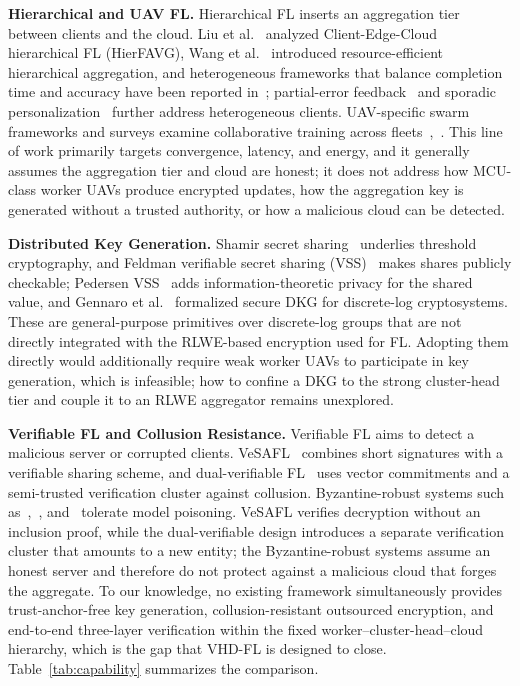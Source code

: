 \textbf{Hierarchical and UAV FL.} Hierarchical FL inserts an aggregation tier between clients and the cloud. Liu et al.~\cite{liu2020hierfavg} analyzed Client-Edge-Cloud hierarchical FL (HierFAVG), Wang et al.~\cite{wang2021rflha} introduced resource-efficient hierarchical aggregation, and heterogeneous frameworks that balance completion time and accuracy have been reported in~\cite{wang2026heterogeneous}; partial-error feedback~\cite{xin2026safe} and sporadic personalization~\cite{rahman2026tackling} further address heterogeneous clients. UAV-specific swarm frameworks and surveys examine collaborative training across fleets~\cite{nagarajan2025drone},~\cite{ahmed2025uav}. This line of work primarily targets convergence, latency, and energy, and it generally assumes the aggregation tier and cloud are honest; it does not address how MCU-class worker UAVs produce encrypted updates, how the aggregation key is generated without a trusted authority, or how a malicious cloud can be detected.

\textbf{Distributed Key Generation.} Shamir secret sharing~\cite{shamir1979} underlies threshold cryptography, and Feldman verifiable secret sharing (VSS)~\cite{feldman1987} makes shares publicly checkable; Pedersen VSS~\cite{pedersen1991} adds information-theoretic privacy for the shared value, and Gennaro et al.~\cite{gennaro2007dkg} formalized secure DKG for discrete-log cryptosystems. These are general-purpose primitives over discrete-log groups that are not directly integrated with the RLWE-based encryption used for FL. Adopting them directly would additionally require weak worker UAVs to participate in key generation, which is infeasible; how to confine a DKG to the strong cluster-head tier and couple it to an RLWE aggregator remains unexplored.

\textbf{Verifiable FL and Collusion Resistance.} Verifiable FL aims to detect a malicious server or corrupted clients. VeSAFL~\cite{bouamama2025vesafl} combines short signatures with a verifiable sharing scheme, and dual-verifiable FL~\cite{cui2026dualverifiable} uses vector commitments and a semi-trusted verification cluster against collusion. Byzantine-robust systems such as~\cite{dong2023privacy},~\cite{cao2024srfl}, and~\cite{jiang2024lancelot} tolerate model poisoning. VeSAFL verifies decryption without an inclusion proof, while the dual-verifiable design introduces a separate verification cluster that amounts to a new entity; the Byzantine-robust systems assume an honest server and therefore do not protect against a malicious cloud that forges the aggregate. To our knowledge, no existing framework simultaneously provides trust-anchor-free key generation, collusion-resistant outsourced encryption, and end-to-end three-layer verification within the fixed worker--cluster-head--cloud hierarchy, which is the gap that \textsc{VHD-FL} is designed to close. Table~\ref{tab:capability} summarizes the comparison.


